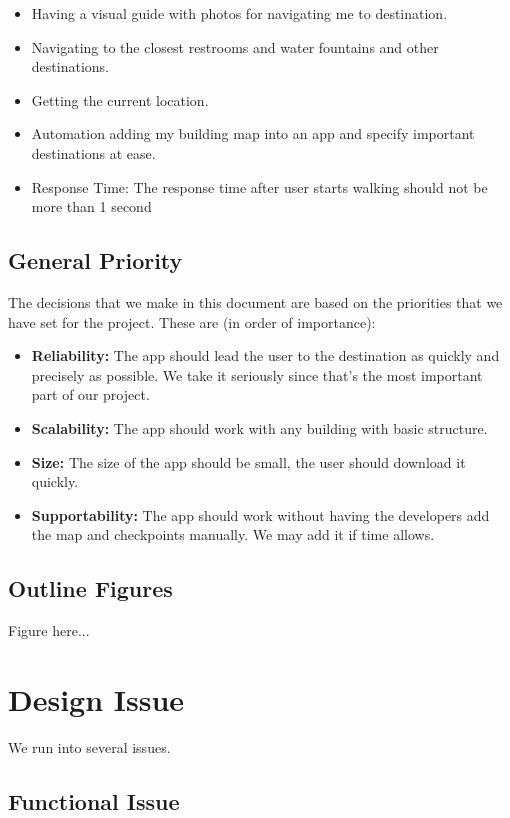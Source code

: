 \documentclass[12pt]{article}
\begin{document}
\begin{itemize}
\item Having a visual guide with photos for navigating me to destination.
\item Navigating to the closest restrooms and water fountains and other destinations.
\item Getting the current location.
\item Automation adding my building map into an app and specify important destinations at ease. 
\item Response Time: The response time after user starts walking should not be more than 1 second

\end{itemize}

\subsection{General Priority}
The decisions that we make in this document are based on the priorities that we have set for the
project. These are (in order of importance):
\begin{itemize}
\item \textbf{Reliability:} The app should lead the user to the destination as quickly and precisely as possible. We take it seriously since that's the most important part of our project.
\item \textbf{Scalability:} The app should work with any building with basic structure.
\item \textbf{Size:} The size of the app should be small, the user should download it quickly.
\item \textbf{Supportability:} The app should work without having the developers add the map and checkpoints manually. We may add it if time allows.
\end{itemize}

\subsection{Outline Figures}


Figure here...



\section{Design Issue}

We run into several issues.

\subsection{Functional Issue}
\end{document}
